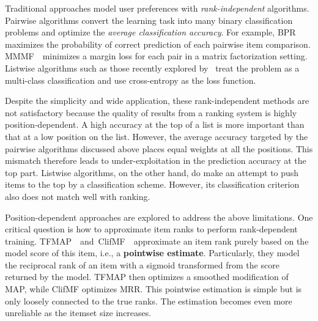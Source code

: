 \documentclass[letterpaper]{article}
\begin{document}
Traditional approaches model user preferences with \textit{rank-independent} algorithms. Pairwise algorithms convert the learning task into many binary classification problems and optimize the \textit{average classification accuracy}. For example, BPR~\cite{rendle2009bpr,rendle2014improving} maximizes the probability of correct prediction of each pairwise item comparison. MMMF~\cite{srebro2005maximum}~minimizes a margin loss for each pair in a matrix factorization setting. Listwise algorithms such as those recently explored by~\cite{hidasi2015session,covington2016deep} treat the problem as a multi-class classification and use cross-entropy as the loss function.

Despite the simplicity and wide application, these rank-independent methods are not satisfactory because the quality of results from a ranking system is highly position-dependent. A high accuracy at the top of a list is more important than that at a low position on the list. However, the average accuracy targeted by the pairwise algorithms discussed above places equal weights at all the positions. This mismatch therefore leads to under-exploitation in the prediction accuracy at the top part. Listwise algorithms, on the other hand, do make an attempt to push items to the top by a classification scheme. However, its classification criterion also does not match well with ranking.

Position-dependent approaches are explored to address the above limitations. One critical question is how to approximate item ranks to perform rank-dependent training. TFMAP~\cite{shi2012tfmap}~and~ClifMF~\cite{shi2012climf}~approximate an item rank purely based on the model score of this item, i.e., a \textbf{pointwise estimate}. Particularly, they model the reciprocal rank of an item with a sigmoid transformed from the score returned by the model. TFMAP then optimizes a smoothed modification of MAP, while ClifMF optimizes MRR. This pointwise estimation is simple but is only loosely connected to the true ranks. The estimation becomes even more unreliable as the itemset size increases.
\end{document}
